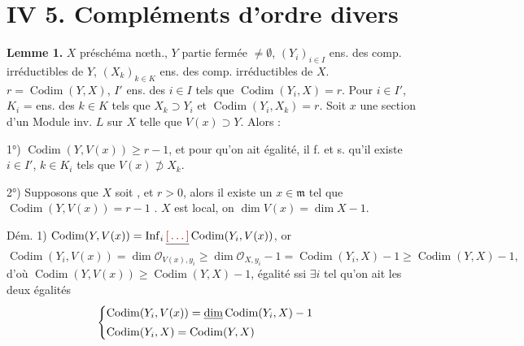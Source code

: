 \documentclass[11pt,a4paper]{article}
\begin{document}
\section{IV 5. Compléments d'ordre divers}



\textbf{Lemme 1.}  $X$ préschéma \struck{\ill{}}
nœth., $Y$ partie fermée $\neq \emptyset$, $(Y_i)_{i \in I}$ ens. des comp.
irréductibles de $Y$, $(X_k)_{k \in K}$ ens. des comp. irréductibles de $X$.
\struck{$\exists$} $r = \operatorname{Codim}(Y, X)$, $I'$ ens. des $i \in I$
tels que $\operatorname{Codim}(Y_i, X) = r$. Pour $i \in I'$, $K_i$ = ens. des
$k \in K$ tels que  $X_k \supset Y_i$ et
$\operatorname{Codim}(Y_i, X_k) = r$. Soit $x$ une section d'un Module inv.
$L$ sur $X$ telle que $V(x) \supset Y$. Alors :

1°)  \struck{\ill{}}
$\operatorname{Codim}(Y, V(x)) \geq r - 1$, et pour qu'on ait égalité, il f. et
s. qu'il existe $i \in I'$, $k \in K_i$ tels que $V(x) \not\supset X_k$.

2°)  Supposons que $X$
soit , \ill{}  et
$r > 0$, alors il existe un \struck{\ill{}} $x \in \mathfrak{m}$ tel que
$\operatorname{Codim}(Y, V(x)) = r - 1$ 
\ill{} \ill{}. $X$ est local, on \ill{} \ill{} $\dim V(x) = \dim X - 1$.

Dém. 1) $\operatorname{Codim}(Y, V(x)) = \operatorname{Inf}_i \struck{\ill{}}
\operatorname{Codim}(Y_i, V(x))$, or
\[
  \operatorname{Codim}(Y_i, V(x)) = \dim \mathcal{O}_{V(x), y_i}
  \geq \dim \mathcal{O}_{X, y_i} - 1 = \operatorname{Codim}(Y_i, X) - 1
  \geq \operatorname{Codim}(Y, X) - 1 ,
\]
d'où $\operatorname{Codim}(Y, V(x)) \geq \operatorname{Codim}(Y, X) - 1$,
égalité ssi $\exists i$ tel qu'on \struck{\ill{}} ait les deux égalités
\[
  \begin{cases}
    \operatorname{Codim}(Y_i, V(x)) = \struck{\dim} \operatorname{Codim}(Y_i, X) - 1 \\
    \operatorname{Codim}(Y_i, X) = \operatorname{Codim}(Y, X)
  \end{cases}
\]
\end{document}
